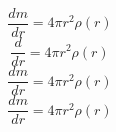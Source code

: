 \begin{equation}
    \frac{dm}{dr} = 4\pi r^2 \rho(r)
\end{equation}
\begin{equation}
    \frac{d}{dr} = 4\pi r^2 \rho(r)
\end{equation}
\begin{equation}
    \frac{dm}{dr} = 4\pi r^2 \rho(r)
\end{equation}
\begin{equation}
    \frac{dm}{dr} = 4\pi r^2 \rho(r)
\end{equation}